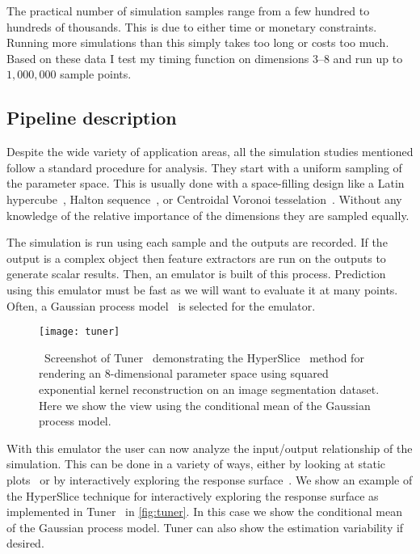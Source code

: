 The practical number of simulation samples range from a few hundred to hundreds
of thousands.  This is due to either time or monetary constraints.  Running more
simulations than this simply takes too long or costs too much.  
Based on these
data I test my timing function on dimensions $3$--$8$ and run up to 
$1,000,000$ sample points.


\subsection{Pipeline description}

Despite the wide variety of application areas, all the simulation studies 
mentioned follow a standard procedure for
analysis.
They start with a uniform sampling of the parameter space. This is
usually done with a space-filling
design like a Latin 
hypercube~\cite{Mckay:1979}, Halton
sequence~\cite{Halton:1964}, or Centroidal Voronoi tesselation~\cite{Du:1999}. 
Without any knowledge of the relative
importance of the dimensions they are sampled equally.

The
simulation is run using each sample and the outputs are recorded. If the
output is a complex object then feature
extractors are run on the outputs to generate scalar results.
Then, an emulator is built of this
process. Prediction using this emulator must be fast as we will want to
evaluate it at many points. Often, a Gaussian process
model~\cite{Rasmussen:2006} is selected for the emulator. 

\begin{figure}[htb]
  \centering
  \texttt{[image: tuner]}
  \caption[Tuner's HyperSlice view]{\
    Screenshot of Tuner~\cite{Torsney-Weir:2011} demonstrating the
    HyperSlice~\cite{Wijk:1993} method for rendering an
    $8$-dimensional parameter space using squared exponential kernel 
    reconstruction on an image segmentation dataset.
    Here we show the view using the conditional mean of the Gaussian 
    process model.
  } 
  \label{fig:tuner}
\end{figure}

With this emulator the user can now analyze the input\slash output
relationship of the simulation. This can be done in a variety of ways, either by
looking at static plots~\cite{Chapman:1994} or by interactively exploring the
response surface~\cite{Torsney-Weir:2011}. We show an example of the
HyperSlice technique for interactively exploring the response surface
as implemented in Tuner~\cite{Torsney-Weir:2011} in \autoref{fig:tuner}.  
In this case we show the conditional mean of the Gaussian process model.
Tuner can also show the estimation variability if desired.

